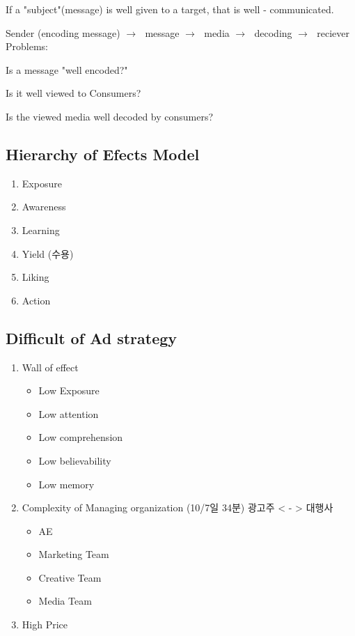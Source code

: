 \documentclass[12pt]{article}
\newcommand{\ra}{$\rightarrow \text{ }$}
\begin{document}
\begin{itemize}
If a "subject"(message) is well given to a target, that is well - communicated.

Sender (encoding message) \ra message \ra media \ra decoding \ra reciever
Problems:

Is a message "well encoded?"

Is it well viewed to Consumers?

Is the viewed media well decoded by consumers?


\subsection{Hierarchy of Efects Model}

\begin{enumerate}
	\item Exposure
	\item Awareness
	\item Learning
	\item Yield	(수용)
	\item Liking
	\item Action
\end{enumerate}

\subsection{Difficult of Ad strategy}

\begin{enumerate}
	\item Wall of effect
	\begin{itemize}
		\item Low Exposure
		\item Low attention
		\item Low comprehension
		\item Low believability
		\item Low memory
	\end{itemize}
	\item Complexity of Managing organization (10/7일 34분) 광고주 < - > 대행사
	\begin{itemize}
		\item AE
		\item Marketing Team
		\item Creative Team
		\item Media Team
	\end{itemize}
	\item High Price


\end{enumerate}


\end{itemize}
\end{document}
